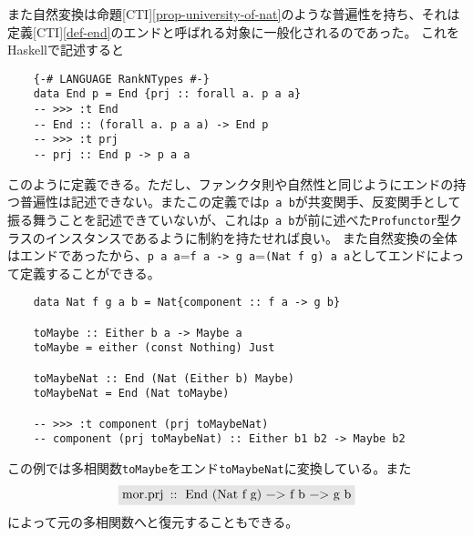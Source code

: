 \documentclass[uplatex,dvipdfmx]{jsarticle}
\newcommand{\pr}[1]{\colorbox[rgb]{0.9,0.9,0.9}{\lstinline{#1}}}
\newcommand{\refcti}[1]{[CTI]\ref{#1}}
\begin{document}
  また自然変換は命題\refcti{prop-university-of-nat}のような普遍性を持ち、それは定義\refcti{def-end}のエンドと呼ばれる対象に一般化されるのであった。
  これをHaskellで記述すると
  \begin{lstlisting}
    {-# LANGUAGE RankNTypes #-}
    data End p = End {prj :: forall a. p a a}
    -- >>> :t End
    -- End :: (forall a. p a a) -> End p
    -- >>> :t prj
    -- prj :: End p -> p a a
  \end{lstlisting}
  このように定義できる。ただし、ファンクタ則や自然性と同じようにエンドの持つ普遍性は記述できない。またこの定義では\pr{p a b}が共変関手、反変関手として振る舞うことを記述できていないが、これは\pr{p a b}が前に述べた\pr{Profunctor}型クラスのインスタンスであるように制約を持たせれば良い。
  また自然変換の全体はエンドであったから、\pr{p a a}=\pr{f a -> g a}=\pr{(Nat f g) a a}としてエンドによって定義することができる。
  \begin{lstlisting}
    data Nat f g a b = Nat{component :: f a -> g b}

    toMaybe :: Either b a -> Maybe a
    toMaybe = either (const Nothing) Just
    
    toMaybeNat :: End (Nat (Either b) Maybe)
    toMaybeNat = End (Nat toMaybe)
    
    -- >>> :t component (prj toMaybeNat)
    -- component (prj toMaybeNat) :: Either b1 b2 -> Maybe b2
  \end{lstlisting}
  この例では多相関数\pr{toMaybe}をエンド\pr{toMaybeNat}に変換している。また\[\pr{mor.prj :: End (Nat f g) -> f b -> g b}\]によって元の多相関数へと復元することもできる。
\end{document}
